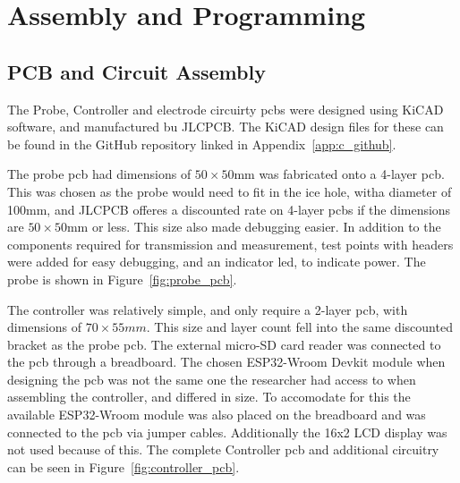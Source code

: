 \section{Assembly and Programming}
\subsection{PCB and Circuit Assembly}
The Probe, Controller and electrode circuirty \gls{pcb}s were designed using KiCAD software, and manufactured bu JLCPCB. The KiCAD design files for these can be found in the GitHub repository linked in Appendix~\ref{app:c_github}.

The probe \gls{pcb} had dimensions of $50\times50$mm was fabricated onto a 4-layer \gls{pcb}.
This was chosen as the probe would need to fit in the ice hole, witha diameter of 100mm, and JLCPCB offeres a discounted rate on 4-layer \gls{pcb}s if the dimensions are $50\times50$mm or less. 
This size also made debugging easier.
In addition to the components required for transmission and measurement, test points with headers were added for easy debugging, and an indicator \gls{led}, to indicate power.
The probe is shown in Figure~\ref{fig:probe_pcb}.



The controller was relatively simple, and only require a 2-layer \gls{pcb}, with dimensions of $70\times55mm$.
This size and layer count fell into the same discounted bracket as the probe \gls{pcb}.
The external micro-SD card reader was connected to the \gls{pcb} through a breadboard.
The chosen ESP32-Wroom Devkit module when designing the \gls{pcb} was not the same one the researcher had access to when assembling the controller, and differed in size.
To accomodate for this the available ESP32-Wroom module was also placed on the breadboard and was connected to the \gls{pcb} via jumper cables.
Additionally the 16x2 LCD display was not used because of this.
The complete Controller \gls{pcb} and additional circuitry can be seen in Figure~\ref{fig:controller_pcb}.

